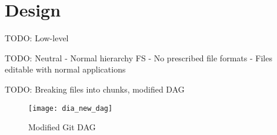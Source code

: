 \chapter{Design}

TODO: Low-level

TODO: Neutral
    - Normal hierarchy FS
    - No prescribed file formats
    - Files editable with normal applications

TODO: Breaking files into chunks, modified DAG

\begin{figure}[h!]
    \caption{Modified Git DAG}
    \label{fig:dia_new_dag}
    \centering
        \texttt{[image: dia\_new\_dag]}
\end{figure}

